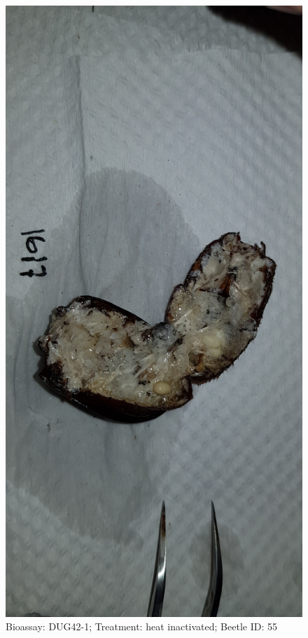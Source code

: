\documentclass[11pt]{scrartcl}
\begin{document}
\begin{figure}[h!]
    \centering
    \includegraphics[width=\linewidth, height=\textheight, keepaspectratio]{uploads/btl.pm_image.b43c7102da766f30.447567343220313631375f5265702d3120284849292e6a7067.jpg}
    \caption{Bioassay: DUG42-1; Treatment: heat inactivated; Beetle ID: 55}
\end{figure}
\clearpage
\end{document}
